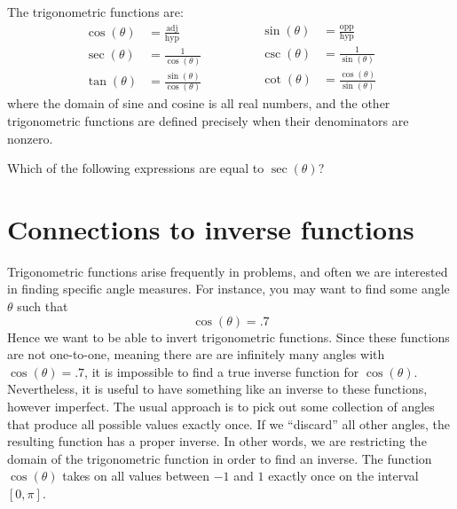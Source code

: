 \documentclass{ximera}
\begin{document}
\begin{definition}
  The trigonometric functions are:
  \[
  \begin{aligned}
  \cos(\theta) &= \frac{\text{adj}}{\text{hyp}}\\
  \sec(\theta) &= \frac{1}{\cos(\theta)}\\
  \tan(\theta) &= \frac{\sin(\theta)}{\cos(\theta)}\qquad
  \end{aligned}
  \qquad
  \begin{aligned}
  \sin(\theta) &= \frac{\text{opp}}{\text{hyp}}\\
  \csc(\theta) &= \frac{1}{\sin(\theta)}\\
  \cot(\theta) &= \frac{\cos(\theta)}{\sin(\theta)}    
  \end{aligned}
  \]
  where the domain of sine and cosine is all real numbers, and the
  other trigonometric functions are defined precisely when their
  denominators are nonzero.
\end{definition}

\begin{question}
  Which of the following expressions are equal to $\sec(\theta)$?
  \begin{selectAll}
    \choice[correct]{$\frac{\tan(\theta)}{\sin(\theta)}$}
  \end{selectAll}
\end{question}


  
\section{Connections to inverse functions}




Trigonometric functions arise frequently in problems, and often we
are interested in finding specific angle measures.  For instance, you may want to find some angle $\theta$ such that
\[
\cos(\theta) = .7
\]
Hence we want to be able to invert trigonometric functions. Since
these functions are not one-to-one, meaning there are are infinitely
many angles with $\cos(\theta) = .7$, it is impossible to find a true
inverse function for $\cos(\theta)$. Nevertheless, it is useful to
have something like an inverse to these functions, however imperfect. The
usual approach is to pick out some collection of angles that produce
all possible values exactly once. If we ``discard'' all
other angles, the resulting function has a proper inverse.  In other words, we are restricting the domain 
of the trigonometric function in order to find an inverse.  The
function $\cos(\theta)$ takes on all values between $-1$ and $1$
exactly once on the interval $[0,\pi]$.
\end{document}
